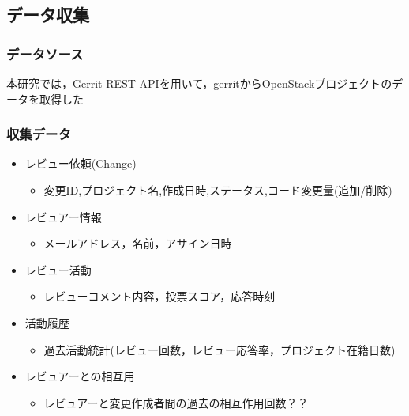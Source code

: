 \documentclass[submit,techrep,noauthor]{ipsj}
\begin{document}
\subsection{データ収集}
\subsubsection{データソース}
本研究では，Gerrit REST APIを用いて，gerritからOpenStackプロジェクトのデータを取得した
\subsubsection{収集データ}
\begin{itemize}
    \item レビュー依頼(Change)
    \begin{itemize}
        \item 変更ID,プロジェクト名,作成日時,ステータス,コード変更量(追加/削除)
    \end{itemize}
\end{itemize}
\begin{itemize}
    \item レビュアー情報
    \begin{itemize}
        \item メールアドレス，名前，アサイン日時
    \end{itemize}
\end{itemize}
\begin{itemize}
    \item レビュー活動
    \begin{itemize}
        \item  レビューコメント内容，投票スコア，応答時刻
    \end{itemize}
\end{itemize}

\begin{itemize}
    \item 活動履歴
    \begin{itemize}
        \item  過去活動統計(レビュー回数，レビュー応答率，プロジェクト在籍日数)
    \end{itemize}
\end{itemize}
\begin{itemize}
    \item レビュアーとの相互用
    \begin{itemize}
        \item レビュアーと変更作成者間の過去の相互作用回数？？
    \end{itemize}
\end{itemize}
\end{document}
